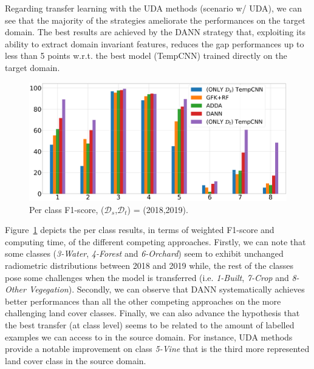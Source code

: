 Regarding transfer learning with the UDA methods (scenario w/ UDA), we can see that the majority of the strategies ameliorate the performances on the target domain. The best results are achieved by the DANN strategy that, exploiting its ability to extract domain invariant features, reduces the gap performances up to less than 5 points w.r.t. the best model (TempCNN) trained directly on the target domain.

\begin{figure}[htb]
  \centering
\includegraphics[width=.95\columnwidth]{Figures/analyse_par-classe300_light_rognee.png}
\caption{Per class F1-score, ($\mathcal{D}_s$,$\mathcal{D}_t$) = (2018,2019).}
\label{fig:perClass}
\end{figure}

Figure~\ref{fig:perClass} depicts the per class results, in terms of weighted F1-score and computing time, of the different competing approaches. Firstly, we can note that some classes (\textit{3-Water}, \textit{4-Forest} and \textit{6-Orchard}) seem to exhibit unchanged radiometric distributions between 2018 and 2019 while, the rest of the classes pose some challenges when the model is transferred (i.e. \textit{1-Built}, \textit{7-Crop} and \textit{8-Other Vegegation}). Secondly, we can observe that DANN systematically achieves better performances than all the other competing approaches on the more challenging land cover classes. Finally, we can also advance the hypothesis that the best transfer (at class level) seems to be related to the amount of labelled examples we can access to in the source domain. For instance, UDA methods provide a notable improvement on class \textit{5-Vine} that is the third more represented land cover class in the source domain.





